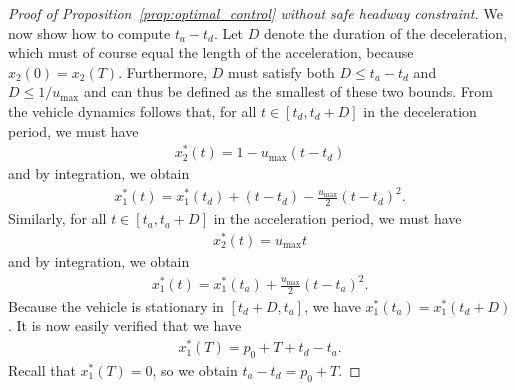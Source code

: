 \documentclass[a4paper]{article}
\theoremstyle{definition}
\theoremstyle{plain}
\begin{document}
\begin{proof}[Proof of Proposition~\ref{prop:optimal_control} without safe
  headway constraint]
We now show how to compute $t_{a} - t_{d}$. Let $D$ denote the duration of the
deceleration, which must of course equal the length of the acceleration, because
$x_{2}(0) = x_{2}(T)$. Furthermore, $D$ must satisfy both $D \leq t_{a} - t_{d}$
and $D \leq 1 / u_{\max}$ and can thus be defined as the smallest of these two
bounds.
%
From the vehicle dynamics follows that, for all $t \in [t_{d}, t_{d} + D]$ in
the deceleration period, we must have
\begin{align*}
  x_{2}^{*}(t) = 1 - u_{\max} (t-t_{d})
\end{align*}
and by integration, we obtain
\begin{align*}
  x_{1}^{*}(t) = x_{1}^{*}(t_{d}) + (t - t_{d}) - \frac{u_{\max}}{2}(t - t_{d})^{2} .
\end{align*}
%
Similarly, for all $t \in [t_{a}, t_{a} + D]$ in the acceleration period, we must have
\begin{align*}
  x_{2}^{*}(t) = u_{\max} t
\end{align*}
and by integration, we obtain
\begin{align*}
  x_{1}^{*}(t) = x_{1}^{*}(t_{a}) + \frac{u_{\max}}{2}(t - t_{a})^{2} .
\end{align*}
%
Because the vehicle is stationary in $[t_{d} + D, t_{a}]$, we have
$x_{1}^{*}(t_{a}) = x_{1}^{*}(t_{d} + D)$.
It is now easily verified that we have
\begin{align*}
  x^{*}_{1}(T) = p_{0} + T + t_{d} - t_{a} .
\end{align*}
Recall that $x^{*}_{1}(T) = 0$, so we obtain $t_{a} - t_{d} = p_{0} + T$.


\end{proof}
\end{document}

